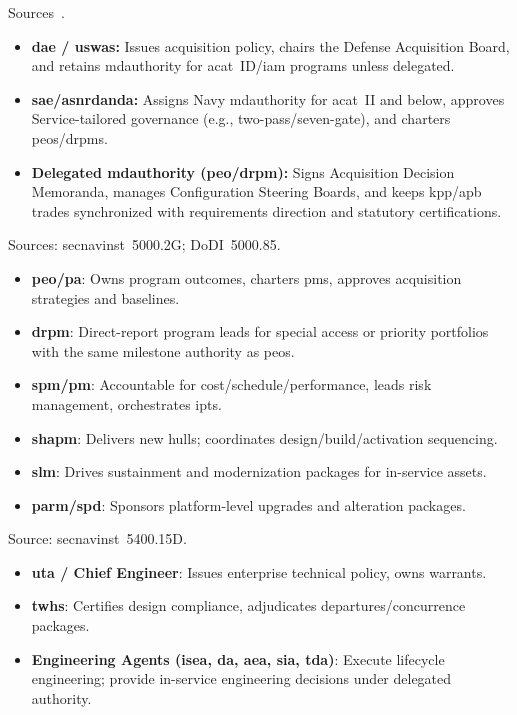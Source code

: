 \documentclass[../main.tex]{subfiles}
\begin{document}
\begin{description}[style=nextline, labelsep=0.5em, font=\bfseries]
  \item[\textbf{Acquisition decision authorities.}]
        Sources~\autocite{DoDD5000-01,DoDI5000-85,SECNAV5000-2G}.
        \begin{itemize}
\item \textbf{\ac{dae} / \ac{uswas}:} Issues acquisition policy, chairs the Defense Acquisition Board, and retains \ac{mdauthority} for \ac{acat}~ID/\ac{iam} programs unless delegated.
\item \textbf{\ac{sae}/\ac{asnrdanda}:} Assigns Navy \ac{mdauthority} for \ac{acat}~II and below, approves Service-tailored governance (e.g., two-pass/seven-gate), and charters \acp{peo}/\acp{drpm}.
          \item \textbf{Delegated \ac{mdauthority} (\ac{peo}/\ac{drpm}):} Signs Acquisition Decision Memoranda, manages Configuration Steering Boards, and keeps \ac{kpp}/\ac{apb} trades synchronized with requirements direction and statutory certifications.
        \end{itemize}

  \item[\textbf{Program Authority chain.}]
        Sources: \ac{secnavinst}~5000.2G; DoDI~5000.85.
        \begin{itemize}
          \item \textbf{\ac{peo}/\ac{pa}}: Owns program outcomes, charters \acp{pm}, approves acquisition strategies and baselines.
          \item \textbf{\ac{drpm}}: Direct-report program leads for special access or priority portfolios with the same milestone authority as \acp{peo}.
          \item \textbf{\ac{spm}/\ac{pm}}: Accountable for cost/schedule/performance, leads risk management, orchestrates \acp{ipt}.
          \item \textbf{\ac{shapm}}: Delivers new hulls; coordinates design/build/activation sequencing.
          \item \textbf{\ac{slm}}: Drives sustainment and modernization packages for in-service assets.
          \item \textbf{\ac{parm}/\ac{spd}}: Sponsors platform-level upgrades and alteration packages.
        \end{itemize}

  \item[\textbf{Technical Authority chain.}]
        Source: \ac{secnavinst}~5400.15D.
        \begin{itemize}
          \item \textbf{\ac{uta} / Chief Engineer}: Issues enterprise technical policy, owns warrants.
          \item \textbf{\acp{twh}}: Certifies design compliance, adjudicates departures/concurrence packages.
          \item \textbf{Engineering Agents (\ac{isea}, \ac{da}, \ac{aea}, \ac{sia}, \ac{tda})}: Execute lifecycle engineering; provide in-service engineering decisions under delegated authority.
        \end{itemize}


\end{description}
\end{document}
